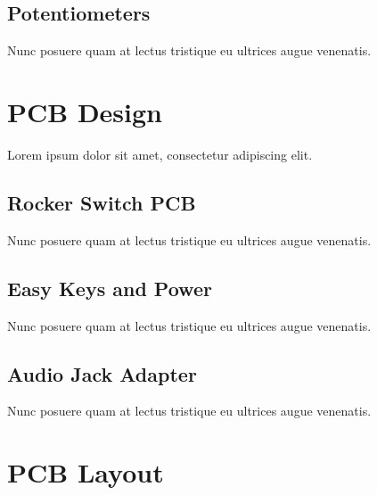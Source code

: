 \subsection{Potentiometers}

Nunc posuere quam at lectus tristique eu ultrices augue venenatis.



\section{PCB Design}

Lorem ipsum dolor sit amet, consectetur adipiscing elit.

\subsection{Rocker Switch PCB}

Nunc posuere quam at lectus tristique eu ultrices augue venenatis.

\subsection{Easy Keys and Power}

Nunc posuere quam at lectus tristique eu ultrices augue venenatis.

\subsection{Audio Jack Adapter}

Nunc posuere quam at lectus tristique eu ultrices augue venenatis.



\section{PCB Layout}

